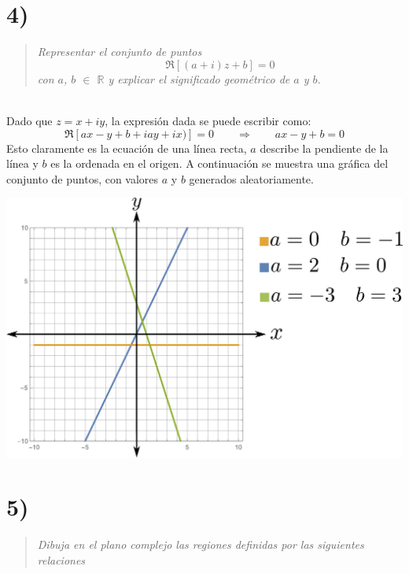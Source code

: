\documentclass{article}
\begin{document}
\section*{4)}
\begin{quote}
\textit{Representar el conjunto de puntos
$$ \Re \left[(a + i)z + b\right]=0$$
con $a$, $b$ $\in$ $\mathbb{R}$ y explicar el significado geométrico de $a$ y $b$. }
\end{quote}\hspace{0.5cm}\\
Dado que $z=x+iy$, la expresión dada se puede escribir como:
$$\Re\left[ax - y+b +iay + ix)\right]= 0\qquad \Rightarrow\qquad ax-y+b=0 $$
Esto claramente es la ecuación de una línea recta, $a$ describe la pendiente de la línea y $b$ es la ordenada en el origen. A continuación se muestra una gráfica del conjunto de puntos, con valores $a$ y $b$ generados aleatoriamente. 
\begin{center}
\includegraphics[scale=0.5]{fig1.pdf}
\end{center}


\section*{5)}
\begin{quote}
\textit{Dibuja en el plano complejo las regiones definidas por las siguientes relaciones }
\end{quote}\hspace{-1.5cm}\\
\end{document}
